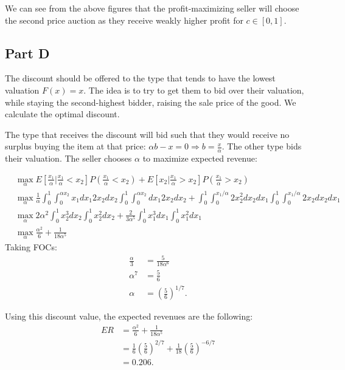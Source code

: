 \documentclass[11pt]{article} %
\begin{document}
We can see from the above figures that the profit-maximizing seller will choose the second price auction as they receive weakly higher profit for $c\in [0,1]$.

\subsection{Part D}
The discount should be offered to the type that tends to have the lowest valuation $F(x) = x$. The idea is to try to get them to bid over their valuation, while staying the second-highest bidder, raising the sale price of the good. We calculate the optimal discount.

The type that receives the discount will bid such that they would receive no surplus buying the item at that price: $\alpha b - x = 0\Rightarrow b = \frac{x}{\alpha}$. The other type bids their valuation. The seller chooses $\alpha$ to maximize expected revenue:

\begin{align*}
&\max_{\alpha} E\left[\frac{x_1}{\alpha}|\frac{x_1}{\alpha}<x_2\right] P\left(\frac{x_1}{\alpha}<x_2\right) + E\left[x_2|\frac{x_1}{\alpha}>x_2\right] P\left(\frac{x_1}{\alpha}>x_2\right)\\
&\max_{\alpha} \frac{1}{\alpha}\int_{0}^1\int_{0}^{\alpha x_2} x_1 dx_1 2x_2 dx_2 \int_{0}^1\int_{0}^{\alpha x_2} dx_1 2x_2 dx_2 + \int_{0}^1\int_{0}^{x_1/\alpha} 2x_2^2 dx_2 dx_1 \int_{0}^1\int_{0}^{x_1/\alpha}2x_2 dx_2  dx_1 \\
&\max_{\alpha} 2\alpha^2\int_{0}^1 x_2^3  dx_2 \int_{0}^1 x_2^2 dx_2 + \frac{2}{3\alpha^5}\int_{0}^1 x_1^3 dx_1 \int_{0}^1 x_1^2 dx_1 \\
&\max_{\alpha} \frac{\alpha^2}{6}+ \frac{1}{18\alpha^5} 
\end{align*}
Taking FOCs:
\begin{align*}
\frac{\alpha}{3} &= \frac{5}{18\alpha^6}\\
\alpha^7 &= \frac{5}{6}\\
\alpha &= \left( \frac{5}{6} \right)^{1/7}.
\end{align*}

Using this discount value, the expected revenues are the following:
\begin{align*}
ER &=  \frac{\alpha^2}{6}+ \frac{1}{18\alpha^5} \\
&= \frac{1}{6}\left( \frac{5}{6} \right)^{2/7} + \frac{1}{18}\left( \frac{5}{6} \right)^{-6/7}\\
&= 0.206.
\end{align*}
\end{document}

